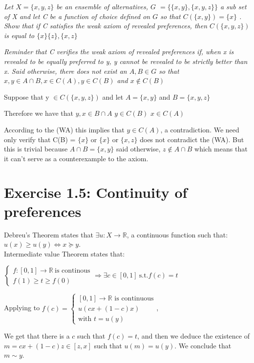\documentclass[11pt]{article} %
\begin{document}
\textit{Let $ X = \{ x,y,z \} $ be an ensemble of alternatives, $ G $ $ = \{\{x,y\},\{x,y,z \} \} $ a sub set of X and let C be a function of choice defined on $ G $ so that $C(\{ x,y \}) = \{ x\}$ . Show that if C satisfies the weak axiom of revealed preferences, then $C(\{x,y,z \})$ is equal to $\{x \} \{z \}, \{x,z \}$}

\textit{Reminder that C verifies the weak axiom of revealed preferences if, when x is revealed to be equally preferred to y, y cannot be revealed to be strictly better than x. Said otherwise, there does not exist an $ A,B \in G $ so that $x, y \in A \cap B, x \in C(A), y \in C(B)$ and $x \notin C(B) $}

Suppose that y $\in C(\{ x,y,z \})$ and let $A = \{x, y \}$ and $B = \{x, y, z \}$

Therefore we have that $y,x \in B \cap A $
$y \in C(B)$
$x \in C(A)$

According to the (WA) this implies that $y \in C(A)$, a contradiction.
We need only verify that C(B) = $\{x \}$ or  $\{x \}$ or $\{x,z \}$ does not contradict the (WA). But this is trivial because $A \cap B = \{x,y \}$ said otherwise, $z \notin A \cap B $ which means that it can't serve as a counterexample to the axiom. 

\section*{Exercise 1.5: Continuity of preferences}

Debreu's Theorem states that $\exists u:X \rightarrow \mathbb{R} $, a continuous function such that: $ u(x) \geq u(y) \Leftrightarrow x \succeq y $. \\

Intermediate value Theorem states that:

$\begin{cases}
f : [0,1] \rightarrow \mathbb{R} \ \textrm{is continous} \\
f(1) \geq t \geq f(0)
\end{cases}
\Rightarrow \exists c \in [0,1] \ \textrm{s.t.} f(c) = t $

Applying to $f(c) = \begin{cases}
[0,1] \rightarrow \mathbb{R}  \textrm{ is continuous} \\
u(cx + (1-c)x)\\
 \textrm{with } t = u(y)
\end{cases}  $, 

We get that there is a $ c$ such that $f(c) = t  $, and then we deduce the existence of $m = cx +(1-c)z \in [z,x]$ such that $u(m) = u(y) $. We conclude that $m \sim y $.
\end{document}
